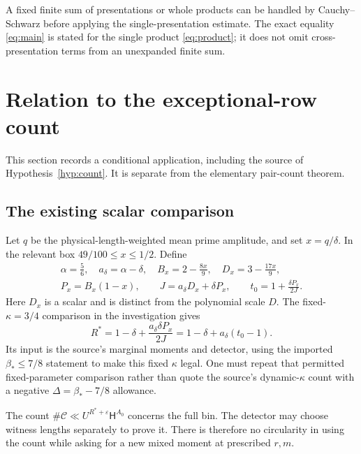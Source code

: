 \documentclass[11pt]{article}
\theoremstyle{definition}
\theoremstyle{remark}
\numberwithin{equation}{section}
\newcommand{\CC}{\mathcal C}
\newcommand{\HH}{\mathsf H}
\newcommand{\ee}{\varepsilon}
\begin{document}
A fixed finite sum of presentations or whole products can be handled
by Cauchy--Schwarz before applying the single-presentation estimate.
The exact equality \eqref{eq:main} is stated for the single product
\eqref{eq:product}; it does not omit cross-presentation terms from an
unexpanded finite sum.

\section{Relation to the exceptional-row count}\label{sec:application}

This section records a conditional application, including the source
of Hypothesis~\ref{hyp:count}. It is separate from the elementary
pair-count theorem.

\subsection{The existing scalar comparison}

Let $q$ be the physical-length-weighted mean prime amplitude, and set
$x=q/\delta$. In the relevant box $49/100\le x\le1/2$. Define
\begin{equation}\label{eq:scalar-params}
\begin{gathered}
\alpha=\frac56,\quad a_\delta=\alpha-\delta,\quad
B_x=2-\frac{8x}{9},\quad D_x=3-\frac{17x}{9},\\
P_x=B_x(1-x),\qquad J=a_\delta D_x+\delta P_x,\qquad
t_0=1+\frac{\delta P_x}{2J}.
\end{gathered}
\end{equation}
Here $D_x$ is a scalar and is distinct from the polynomial scale $D$.
The fixed-$\kappa=3/4$ comparison in the investigation gives
\begin{equation}\label{eq:Rstar}
R^*=1-\delta+\frac{a_\delta\delta P_x}{2J}
=1-\delta+a_\delta(t_0-1).
\end{equation}
Its input is the source's marginal moments and detector, using the
imported $\beta_*\le7/8$ statement to make this fixed $\kappa$ legal.
One must repeat that permitted fixed-parameter comparison rather than
quote the source's dynamic-$\kappa$ count with a negative
$\Delta=\beta_*-7/8$ allowance.

The count $\#\CC\ll U^{R^*+\ee}\HH^{A_0}$ concerns the full bin.
The detector may choose witness lengths separately to prove it.
There is therefore no circularity in using the count while asking for
a new mixed moment at prescribed $r,m$.
\end{document}
